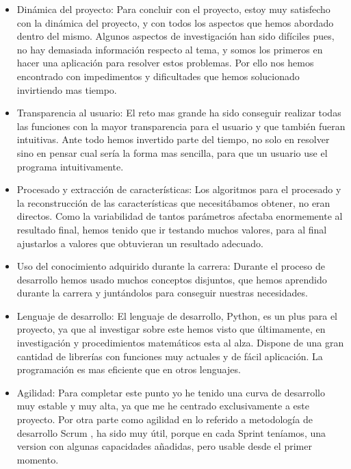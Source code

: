 \begin{itemize}
\item Dinámica del proyecto: Para concluir con el proyecto, estoy muy satisfecho con la dinámica del proyecto, y con todos los aspectos que hemos abordado dentro del mismo.
Algunos aspectos de investigación han sido difíciles pues, no hay demasiada información respecto al tema, y somos los primeros en hacer una aplicación para resolver estos problemas. Por ello nos hemos encontrado con impedimentos y dificultades que hemos solucionado invirtiendo mas tiempo.

\item Transparencia al usuario: El reto mas grande ha sido conseguir realizar todas las funciones con la mayor transparencia para el usuario y que también fueran intuitivas. Ante todo hemos invertido parte del tiempo, no solo en resolver sino en pensar cual sería la forma mas sencilla, para que un usuario use el programa intuitivamente. 

\item Procesado y extracción de características: Los algoritmos para el procesado y la reconstrucción de las características que necesitábamos obtener, no eran directos. Como la variabilidad de tantos parámetros afectaba enormemente al resultado final, hemos tenido que ir testando muchos valores, para al final ajustarlos a valores que obtuvieran un resultado adecuado.

\item Uso del conocimiento adquirido durante la carrera: Durante el proceso de desarrollo hemos usado muchos conceptos disjuntos, que hemos aprendido durante la carrera y juntándolos para conseguir nuestras necesidades.

\item Lenguaje de desarrollo: El lenguaje de desarrollo, Python, es un plus para el proyecto, ya que al investigar sobre este hemos visto que últimamente, en investigación y procedimientos matemáticos esta al alza. Dispone de una gran cantidad de librerías con funciones muy actuales y de fácil aplicación. La programación es mas eficiente que en otros lenguajes.

\item Agilidad: Para completar este punto yo he tenido una curva de desarrollo muy estable y muy alta, ya que me he centrado exclusivamente a este proyecto.
Por otra parte como agilidad en lo referido a metodología de desarrollo Scrum \cite{Scrum}, ha sido muy útil, porque en cada Sprint teníamos, una version con algunas capacidades añadidas, pero usable desde el primer momento.


\end{itemize}
